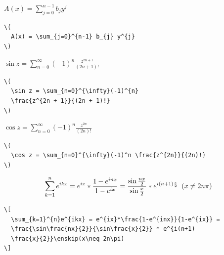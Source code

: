 \documentclass[a4paper,10pt,twoside]{scrbook}
\begin{document}
\begin{minipage}[c]{.38\textwidth}
\setlength{\parskip}{1em}
\centering
\(
  A(x) = \sum_{j=0}^{n-1} b_{j} y^{j}
\)
\end{minipage}
\hfill
\begin{minipage}[c]{.6\textwidth}
\setlength{\parskip}{1em}
\begin{lstlisting}[label=formelbeispiel4, style=customlatex]
\(
  A(x) = \sum_{j=0}^{n-1} b_{j} y^{j}
\)
\end{lstlisting}
\end{minipage}


\begin{minipage}[c]{.38\textwidth}
\setlength{\parskip}{1em}
\centering
\(
  \sin z = \sum_{n=0}^{\infty}(-1)^{n}
  \frac{z^{2n + 1}}{(2n + 1)!} 
\)
\end{minipage}
\hfill
\begin{minipage}[c]{.6\textwidth}
\setlength{\parskip}{1em}
\begin{lstlisting}[label=formelbeispiel5, style=customlatex]
\(
  \sin z = \sum_{n=0}^{\infty}(-1)^{n}
  \frac{z^{2n + 1}}{(2n + 1)!}  
\)
\end{lstlisting}
\end{minipage}


\begin{minipage}[c]{.38\textwidth}
\setlength{\parskip}{1em}
\centering
\(
  \cos z = \sum_{n=0}^{\infty}(-1)^n \frac{z^{2n}}{(2n)!} 
\)
\end{minipage}
\hfill
\begin{minipage}[c]{.6\textwidth}
\setlength{\parskip}{1em}
\begin{lstlisting}[label=formelbeispiel6, style=customlatex]
\(
  \cos z = \sum_{n=0}^{\infty}(-1)^n \frac{z^{2n}}{(2n)!} 
\)
\end{lstlisting}
\end{minipage}


\[
  \sum_{k=1}^{n}e^{ikx} = e^{ix}*\frac{1-e^{inx}}{1-e^{ix}} =
  \frac{\sin\frac{nx}{2}}{\sin\frac{x}{2}} * e^{i(n+1)
  \frac{x}{2}}\enskip(x\neq 2n\pi)
\]


\begin{lstlisting}[label=formelbeispiel7, style=customlatex]
\[
  \sum_{k=1}^{n}e^{ikx} = e^{ix}*\frac{1-e^{inx}}{1-e^{ix}} =
  \frac{\sin\frac{nx}{2}}{\sin\frac{x}{2}} * e^{i(n+1)
  \frac{x}{2}}\enskip(x\neq 2n\pi)
\]
\end{lstlisting}
\end{document}
